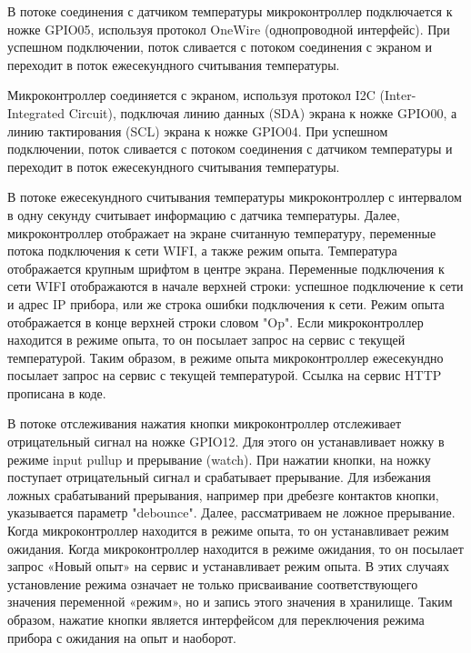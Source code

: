 \documentclass[12pt]{extarticle}
\begin{document}

В потоке соединения с датчиком температуры микроконтроллер подключается к ножке GPIO05, используя протокол OneWire (однопроводной интерфейс). При успешном подключении, поток сливается с потоком соединения с экраном и переходит в поток ежесекундного считывания температуры.

Микроконтроллер соединяется с экраном, используя протокол I2C (Inter-Integra\-ted Circuit), подключая линию данных (SDA) экрана к ножке GPIO00, а линию тактирования (SCL) экрана к ножке GPIO04. При успешном подключении, поток сливается с потоком соединения с датчиком температуры и переходит в поток ежесекундного считывания температуры.

В потоке ежесекундного считывания температуры микроконтроллер с интервалом в одну секунду считывает информацию с датчика температуры. Далее, микроконтроллер отображает на экране считанную температуру, переменные потока подключения к сети WIFI, а также режим опыта. Температура отображается крупным шрифтом в центре экрана. Переменные подключения к сети WIFI отображаются в начале верхней строки: успешное подключение к сети и адрес IP прибора, или же строка ошибки подключения к сети. Режим опыта отображается в конце верхней строки словом "Op". Если микроконтроллер находится в режиме опыта, то он посылает запрос на сервис с текущей температурой. Таким образом, в режиме опыта микроконтроллер ежесекундно посылает запрос на сервис с текущей температурой. Ссылка на сервис HTTP прописана в коде.

В потоке отслеживания нажатия кнопки микроконтроллер отслеживает отрицательный сигнал на ножке GPIO12. Для этого он устанавливает ножку в режиме input pullup и прерывание (watch). При нажатии кнопки, на ножку поступает отрицательный сигнал и срабатывает прерывание. Для избежания ложных срабатываний прерывания, например при дребезге контактов кнопки, указывается параметр "debounce".  %
Далее, рассматриваем не ложное прерывание. Когда микроконтроллер находится в режиме опыта, то он устанавливает режим ожидания. Когда микроконтроллер находится в режиме ожидания, то он посылает запрос «Новый опыт» на сервис и устанавливает режим опыта. В этих случаях установление режима означает не только присваивание соответствующего значения переменной «режим», но и запись этого значения в хранилище.  Таким образом, нажатие кнопки является интерфейсом для переключения режима прибора с ожидания на опыт и наоборот.
\end{document}
